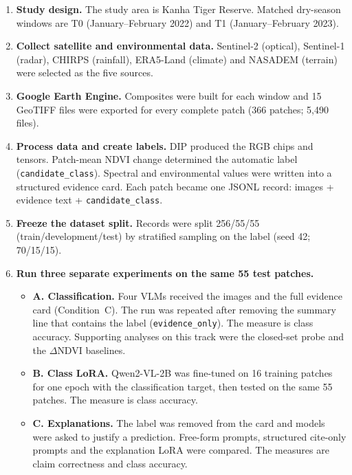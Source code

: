 \documentclass[11pt]{article}
\begin{document}
\begin{enumerate}
\item \textbf{Study design.} The study area is Kanha Tiger Reserve.
Matched dry-season windows are T0 (January--February 2022) and T1
(January--February 2023).

\item \textbf{Collect satellite and environmental data.} Sentinel-2
(optical), Sentinel-1 (radar), CHIRPS (rainfall), ERA5-Land (climate)
and NASADEM (terrain) were selected as the five sources.

\item \textbf{Google Earth Engine.} Composites were built for each
window and 15 GeoTIFF files were exported for every complete patch
(366 patches; 5,490 files).

\item \textbf{Process data and create labels.} DIP produced the RGB
chips and tensors. Patch-mean NDVI change determined the automatic
label (\texttt{candidate\_class}). Spectral and environmental values
were written into a structured evidence card. Each patch became one
JSONL record: images + evidence text + \texttt{candidate\_class}.

\item \textbf{Freeze the dataset split.} Records were split
256/55/55 (train/development/test) by stratified sampling on the
label (seed 42; 70/15/15).

\item \textbf{Run three separate experiments on the same 55 test
patches.}
\begin{itemize}
\item \textbf{A. Classification.} Four VLMs received the images and
the full evidence card (Condition~C). The run was repeated after
removing the summary line that contains the label
(\texttt{evidence\_only}). The measure is class accuracy.
Supporting analyses on this track were the closed-set probe and the
$\Delta$NDVI baselines.
\item \textbf{B. Class LoRA.} Qwen2-VL-2B was fine-tuned on 16
training patches for one epoch with the classification target, then
tested on the same 55 patches. The measure is class accuracy.
\item \textbf{C. Explanations.} The label was removed from the card
and models were asked to justify a prediction. Free-form prompts,
structured cite-only prompts and the explanation LoRA were compared.
The measures are claim correctness and class accuracy.
\end{itemize}
\end{enumerate}
\end{document}

